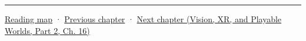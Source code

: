 \begin{center}\rule{0.5\linewidth}{0.5pt}\end{center}

\hyperref[volume-reading-map]{Reading map} · \hyperref[06-engine-ii-ch039-composable-timesteps-and-stable-simulation-policy]{Previous chapter} · \href{../07-Vision-XR-and-Playable-Worlds-P02/main.pdf\#nameddest=06-engine-ii-ch041-evidence-tools-and-revisable-design}{Next chapter (Vision, XR, and Playable Worlds, Part 2, Ch. 16)}
